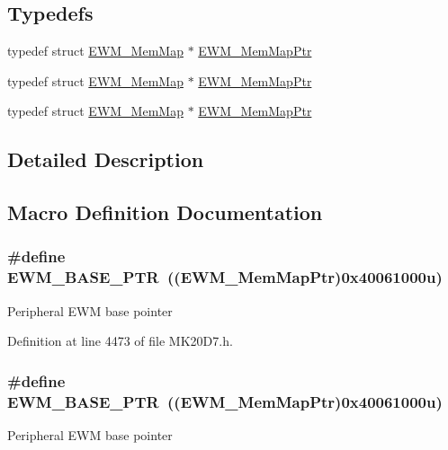 \subsection*{Typedefs}
\begin{DoxyCompactItemize}
\item 
typedef struct \hyperlink{struct_e_w_m___mem_map}{E\+W\+M\+\_\+\+Mem\+Map} $\ast$ \hyperlink{group___e_w_m___peripheral_ga1de35bc04fc7fa4929507210147339a6}{E\+W\+M\+\_\+\+Mem\+Map\+Ptr}
\item 
typedef struct \hyperlink{struct_e_w_m___mem_map}{E\+W\+M\+\_\+\+Mem\+Map} $\ast$ \hyperlink{group___e_w_m___peripheral_ga1de35bc04fc7fa4929507210147339a6}{E\+W\+M\+\_\+\+Mem\+Map\+Ptr}
\item 
typedef struct \hyperlink{struct_e_w_m___mem_map}{E\+W\+M\+\_\+\+Mem\+Map} $\ast$ \hyperlink{group___e_w_m___peripheral_ga1de35bc04fc7fa4929507210147339a6}{E\+W\+M\+\_\+\+Mem\+Map\+Ptr}
\end{DoxyCompactItemize}


\subsection{Detailed Description}


\subsection{Macro Definition Documentation}
\subsubsection[{\texorpdfstring{E\+W\+M\+\_\+\+B\+A\+S\+E\+\_\+\+P\+TR}{EWM_BASE_PTR}}]{\setlength{\rightskip}{0pt plus 5cm}\#define E\+W\+M\+\_\+\+B\+A\+S\+E\+\_\+\+P\+TR~(({\bf E\+W\+M\+\_\+\+Mem\+Map\+Ptr})0x40061000u)}\hypertarget{group___e_w_m___peripheral_gae3454b5b37183b746362498d1fafc40c}{}\label{group___e_w_m___peripheral_gae3454b5b37183b746362498d1fafc40c}
Peripheral E\+WM base pointer 

Definition at line 4473 of file M\+K20\+D7.\+h.

\subsubsection[{\texorpdfstring{E\+W\+M\+\_\+\+B\+A\+S\+E\+\_\+\+P\+TR}{EWM_BASE_PTR}}]{\setlength{\rightskip}{0pt plus 5cm}\#define E\+W\+M\+\_\+\+B\+A\+S\+E\+\_\+\+P\+TR~(({\bf E\+W\+M\+\_\+\+Mem\+Map\+Ptr})0x40061000u)}\hypertarget{group___e_w_m___peripheral_gae3454b5b37183b746362498d1fafc40c}{}\label{group___e_w_m___peripheral_gae3454b5b37183b746362498d1fafc40c}
Peripheral E\+WM base pointer 

